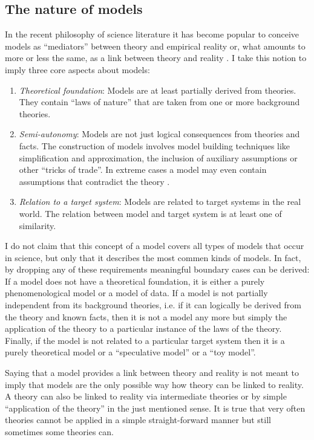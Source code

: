 \documentclass[onecollarge]{STJour}
\numberwithin{equation}{section}
\begin{document}
\subsection{The nature of models}

In the recent philosophy of science literature it has become popular to
conceive models as ``mediators'' between theory and empirical
reality \citep{morgan-morrison:1999} or, what amounts to more or less
the same, as a link between theory and reality \citep{winsberg:2001}. I
take this notion to imply three core aspects about models:

\begin{enumerate}
  \item {\em Theoretical foundation}: Models are at least partially
  derived from theories. They contain ``laws of nature'' that are taken from
  one or more background theories. 
  \item {\em Semi-autonomy}:\label{semi-autonomy} Models are not just
  logical consequences from theories and facts. The
  construction of models involves model building techniques 
  like simplification and approximation, the
  inclusion of auxiliary assumptions or other ``tricks of trade''.
  In extreme cases a model may even contain assumptions that contradict
  the theory \citep[2.14]{k_uuml_ppers2005}.
  \item {\em Relation to a target system}: Models are related to target
  systems in the real world. The relation between model and target system is at
  least one of similarity.
\end{enumerate}

I do not claim that this concept of a model covers all types of
models that occur in science, but only that it describes the most commen
kinds of models. In fact, by dropping any of these requirements
meaningful boundary cases can be derived: If a model does not have a
theoretical foundation, it is either a purely phenomenological model or a
model of data. If a model is not partially independent from its
background theories, i.e. if it can logically be derived from the theory
and known facts, then it is not a model any more but simply the
application of the theory to a particular instance of the laws of the
theory. Finally, if the model is not related to a particular target
system then it is a purely theoretical model or a ``speculative model''
or a ``toy model''. 

Saying that a model provides a link between theory and reality is 
not meant to imply that models are the only possible way how theory can be
linked to reality. A theory can also be linked to reality via
intermediate theories or by simple ``application of the theory''
\label{simple-application} in the just mentioned sense. It is true that
very often theories cannot be applied in a simple straight-forward manner
but still sometimes some theories can.
\end{document}
